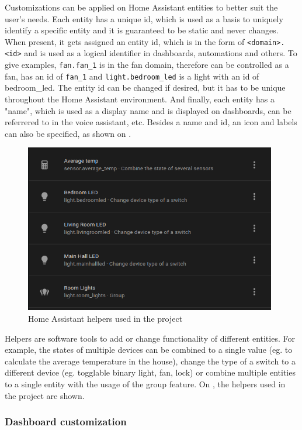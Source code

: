 Customizations can be applied on Home Assistant entities to better suit the user's needs. Each entity has a unique id, which is used as a basis to uniquely identify a specific entity and it is guaranteed to be static and never changes. \cite{HAFAQUniqueID} When present, it gets assigned an entity id, which is in the form of \verb+<domain>.<id>+ and is used as a logical identifier in dashboards, automations and others. \cite{HAEntitiesDomains} To give examples, \verb+fan.fan_1+ is in the fan domain, therefore can be controlled as a fan, has an id of \verb+fan_1+ and \verb+light.bedroom_led+ is a light with an id of bedroom\_led. The entity id can be changed if desired, but it has to be unique throughout the Home Assistant environment. And finally, each entity has a "name", which is used as a display name and is displayed on dashboards, can be referrered to in the voice assistant, etc. Besides a name and id, an icon and labels can also be specified, as shown on .

\begin{figure}[!ht]
  \centering
  \includegraphics[width=110mm, keepaspectratio]{figures/homeassistant_helpers.png}
  \caption{Home Assistant helpers used in the project}
  \label{fig:HAhelpers}
\end{figure}

Helpers are software tools to add or change functionality of different entities. For example, the states of multiple devices can be combined to a single value (eg. to calculate the average temperature in the house), change the type of a switch to a different device (eg. togglable binary light, fan, lock) or combine multiple entities to a single entity with the usage of the group feature. On , the helpers used in the project are shown.

\subsubsection{Dashboard customization}

